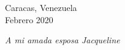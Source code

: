 \vspace{1.5cm}

\begin{center}
Caracas, Venezuela \\
Febrero 2020
\end{center}

\newpage
\thispagestyle{empty}

\vspace{2cm}

\hspace{6cm}
\begin{flushright}
\begin{large}



\textit{A mi amada esposa Jacqueline}
\end{large}
\end{flushright}




\vspace{1.5cm}

\newpage
